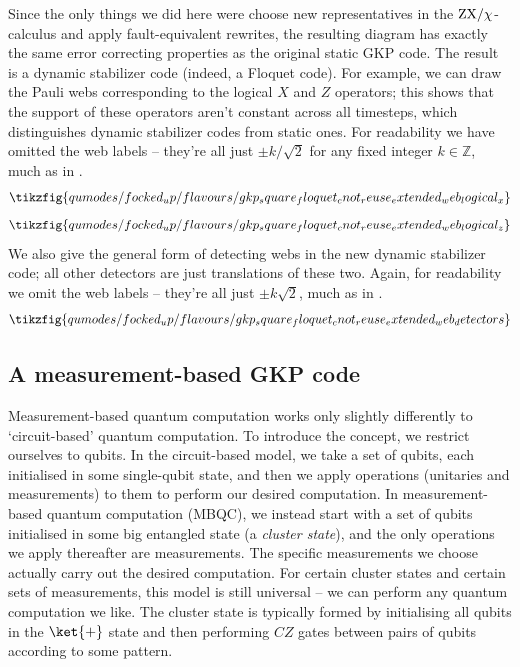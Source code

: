 Since the only things we did here were choose new representatives in the $\text{ZX}/\chi$-calculus and apply fault-equivalent rewrites, the resulting diagram has exactly the same error correcting properties as the original static GKP code.
The result is a dynamic stabilizer code (indeed, a Floquet code).
For example, we can draw the Pauli webs corresponding to the logical $X$ and $Z$ operators; this shows that the support of these operators aren't constant across all timesteps, which distinguishes dynamic stabilizer codes from static ones.
For readability we have omitted the web labels -- they're all just $\pm k/\sqrt{2}$ for any fixed integer $k \in \mathbb{Z}$, much as in .
\begin{equation}
    \tikzfig{qumodes/focked_up/flavours/gkp_square_floquet_cnot_reuse_extended_web_logical_x}
\end{equation}
\begin{equation}
    \tikzfig{qumodes/focked_up/flavours/gkp_square_floquet_cnot_reuse_extended_web_logical_z}
\end{equation}
We also give the general form of detecting webs in the new dynamic stabilizer code; all other detectors are just translations of these two.
Again, for readability we omit the web labels -- they're all just $\pm k\sqrt{2}$, much as in .
\begin{equation}
    \tikzfig{qumodes/focked_up/flavours/gkp_square_floquet_cnot_reuse_extended_web_detectors}
\end{equation}

\subsection{A measurement-based GKP code}\label{subsec:measurement-based-gkp-code}

Measurement-based quantum computation works only slightly differently to `circuit-based' quantum computation.
To introduce the concept, we restrict ourselves to qubits.
In the circuit-based model, we take a set of qubits, each initialised in some single-qubit state, and then we apply operations (unitaries and measurements) to them to perform our desired computation.
In measurement-based quantum computation (MBQC), we instead start with a set of qubits initialised in some big entangled state (a \textit{cluster state}), and the only operations we apply thereafter are measurements.
The specific measurements we choose actually carry out the desired computation.
For certain cluster states and certain sets of measurements, this model is still universal -- we can perform any quantum computation we like.
The cluster state is typically formed by initialising all qubits in the $\ket{+}$ state and then performing $CZ$ gates between pairs of qubits according to some pattern.


